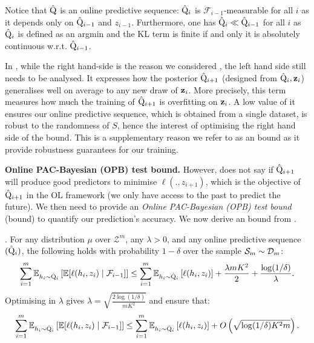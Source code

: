  Notice that $\hat{\mathrm{Q}}$ is an online predictive sequence: $\hat{\mathrm{Q}}_i$ is $\mathcal{F}_{i-1}$-measurable for all $i$ as it depends only on $\hat{\mathrm{Q}}_{i-1}$ and $z_{i-1}$. Furthermore, one has $\hat{\mathrm{Q}}_{i} \ll \hat{\mathrm{Q}}_{i-1}$ for all $i$ as $\hat{\mathrm{Q}}_{i}$ is defined as an argmin and the KL term is finite if and only it is absolutely continuous w.r.t. $\hat{\mathrm{Q}}_{i-1}$.


\begin{remark}
  In , while the right hand-side is the reason we considered , the left hand side still needs to be analysed. It expresses how the posterior $\hat{\mathrm{Q}}_{i+1}$ (designed from $\hat{\mathrm{Q}}_i,\mathbf{z}_i$) generalises well on average to any new draw of $\mathbf{z}_i$. More precisely, this term measures how much the training of $\hat{\mathrm{Q}}_{i+1}$ is overfitting on $\mathbf{z}_i$. A low value of it ensures our online predictive sequence, which is obtained from a single dataset, is robust to the randomness of $S$, hence the interest of optimising the right hand side of the bound.
  This is a supplementary reason we refer to  as an \OPBTrain bound as it provide robustness guarantees for our training.
\end{remark}



\textbf{Online PAC-Bayesian (OPB) test bound.}
However,  does not say if $\hat{\mathrm{Q}}_{i+1}$ will produce good predictors to minimise $\ell(.,z_{i+1})$, which is the objective of $\hat{\mathrm{Q}}_{i+1}$ in the OL framework (we only have access to the past to predict the future). We then need to provide an \emph{Online PAC-Bayesian (OPB) test bound} (\OPBTest bound) to quantify our prediction's accuracy. We now derive an \OPBTest bound from .

\begin{corollary}
  \label{cor: test_bound_online}.
  For any distribution $\mu$ over $\mathcal{Z}^m$, any $\lambda>0$, and any online predictive sequence $(\hat{\mathrm{Q}}_i)$, the following holds with probability $1-\delta$ over the sample $\mathcal{S}_m\sim\mathcal{D}_{m}$:
  \begin{align*}
    \sum_{i=1}^m \mathbb{E}_{h_i\sim \hat{\mathrm{Q}}_{i}}\left[ \mathbb{E}[\ell(h_i,z_i) \mid \mathcal{F}_{i-1}]    \right] \leq \sum_{i=1}^m \mathbb{E}_{h_i\sim \hat{\mathrm{Q}}_{i}}\left[ \ell(h_i,z_i) \right] + \frac{\lambda m K^2}{2} + \frac{\log(1/\delta)}{\lambda}.
  \end{align*}
  Optimising in $\lambda$ gives $\lambda= \sqrt{\frac{2\log(1/\delta)}{mK^2} }$ and ensure that:
  \begin{align*}
    \sum_{i=1}^m \mathbb{E}_{h_i\sim \hat{\mathrm{Q}}_{i}}\left[ \mathbb{E}[\ell(h_i,z_i) \mid \mathcal{F}_{i-1}]    \right] \leq \sum_{i=1}^m \mathbb{E}_{h_i\sim \hat{\mathrm{Q}}_{i}}\left[ \ell(h_i,z_i) \right] + O\left(\sqrt{\log(1/\delta) K^2m}\right).
  \end{align*}

\end{corollary}

